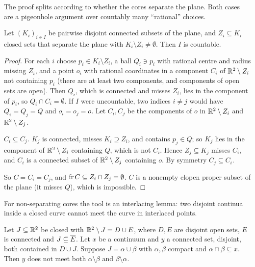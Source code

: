 The proof splits according to whether the cores separate the plane. Both cases are a pigeonhole
argument over countably many ``rational'' choices.

\begin{proposition}\label{prop:moore73}
Let $(K_i)_{i\in I}$ be pairwise disjoint connected subsets of the plane, and $Z_i\subseteq K_i$ closed sets
that separate the plane with $K_i\setminus Z_i\neq\emptyset$. Then $I$ is countable.
\end{proposition}

\begin{proof}
For each $i$ choose $p_i\in K_i\setminus Z_i$, a ball $Q_i\ni p_i$ with rational centre and radius missing $Z_i$,
and a point $o_i$ with rational coordinates in a component $C_i$ of $\mathbb{R}^2\setminus Z_i$ not containing $p_i$
(there are at least two components, and components of open sets are open). Then $Q_i$, which is connected
and misses $Z_i$, lies in the component of $p_i$, so $Q_i\cap C_i=\emptyset$. If $I$ were uncountable, two
indices $i\neq j$ would have $Q_i=Q_j=Q$ and $o_i=o_j=o$. Let $C_i,C_j$ be the components of $o$ in
$\mathbb{R}^2\setminus Z_i$ and $\mathbb{R}^2\setminus Z_j$.

\emph{$C_i\subseteq C_j$.} $K_j$ is connected, misses $K_i\supseteq Z_i$, and contains $p_j\in Q$; so $K_j$ lies in the
component of $\mathbb{R}^2\setminus Z_i$ containing $Q$, which is not $C_i$. Hence $Z_j\subseteq K_j$ misses $C_i$, and
$C_i$ is a connected subset of $\mathbb{R}^2\setminus Z_j$ containing $o$. By symmetry $C_j\subseteq C_i$.

So $C=C_i=C_j$, and $\operatorname{fr} C\subseteq Z_i\cap Z_j=\emptyset$. $C$ is a nonempty clopen proper subset of the
plane (it misses $Q$), which is impossible.
\end{proof}


For non-separating cores the tool is an interlacing lemma: two disjoint continua inside a closed curve
cannot meet the curve in interlaced points.

\begin{lemma}\label{lem:interlace}
Let $J\subseteq\mathbb{R}^2$ be closed with $\mathbb{R}^2\setminus J=D\cup E$, where $D,E$ are disjoint open sets, $E$ is connected
and $J\subseteq\overline{E}$. Let $x$ be a continuum and $y$ a connected set, disjoint, both contained in $D\cup J$.
Suppose $J=\alpha\cup\beta$ with $\alpha,\beta$ compact and $\alpha\cap\beta\subseteq x$. Then $y$ does not meet both
$\alpha\setminus\beta$ and $\beta\setminus\alpha$.
\end{lemma}

